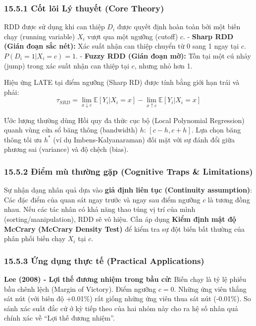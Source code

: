 \documentclass[
]{article}
\begin{document}
\subsubsection{15.5.1 Cốt lõi Lý thuyết (Core
Theory)}\label{cux1ed1t-luxf5i-luxfd-thuyux1ebft-core-theory-50}

RDD được sử dụng khi can thiệp \(D_i\) được quyết định hoàn toàn bởi một
biến chạy (running variable) \(X_i\) vượt qua một ngưỡng (cutoff) \(c\).
- \textbf{Sharp RDD (Gián đoạn sắc nét):} Xác suất nhận can thiệp chuyển
từ 0 sang 1 ngay tại \(c\). \(P(D_i=1|X_i=c) = 1\). - \textbf{Fuzzy RDD
(Gián đoạn mờ):} Tồn tại một cú nhảy (jump) trong xác suất nhận can
thiệp tại \(c\), nhưng nhỏ hơn 1.

Hiệu ứng LATE tại điểm ngưỡng (Sharp RD) được tính bằng giới hạn trái và
phải:
\[ \tau_{SRD} = \lim_{x \downarrow c} \mathbb{E}[Y_i | X_i = x] - \lim_{x \uparrow c} \mathbb{E}[Y_i | X_i = x] \]

Ước lượng thường dùng Hồi quy đa thức cục bộ (Local Polynomial
Regression) quanh vùng cửa sổ băng thông (bandwidth) \(h\):
\([c-h, c+h]\). Lựa chọn băng thông tối ưu \(h^*\) (ví dụ
Imbens-Kalyanaraman) đối mặt với sự đánh đổi giữa phương sai (variance)
và độ chệch (bias).

\subsubsection{15.5.2 Điểm mù thường gặp (Cognitive Traps \&
Limitations)}\label{ux111iux1ec3m-muxf9-thux1b0ux1eddng-gux1eb7p-cognitive-traps-limitations-101}

Sự nhận dạng nhân quả dựa vào \textbf{giả định liên tục (Continuity
assumption)}: Các đặc điểm của quan sát ngay trước và ngay sau điểm
ngưỡng \(c\) là tương đồng nhau. Nếu các tác nhân có khả năng thao túng
vị trí của mình (sorting/manipulation), RDD sẽ vô hiệu. Cần áp dụng
\textbf{Kiểm định mật độ McCrary (McCrary Density Test)} để kiểm tra sự
đột biến bất thường của phân phối biến chạy \(X_i\) tại \(c\).

\subsubsection{15.5.3 Ứng dụng thực tế (Practical
Applications)}\label{ux1ee9ng-dux1ee5ng-thux1ef1c-tux1ebf-practical-applications-57}

\textbf{Lee (2008) - Lợi thế đương nhiệm trong bầu cử:} Biến chạy là tỷ
lệ phiếu bầu chênh lệch (Margin of Victory). Điểm ngưỡng \(c=0\). Những
ứng viên thắng sát nút (với biên độ +0.01\%) rất giống những ứng viên
thua sát nút (-0.01\%). So sánh xác suất đắc cử ở kỳ tiếp theo của hai
nhóm này cho ra hệ số nhân quả chính xác về ``Lợi thế đương nhiệm''.
\end{document}

